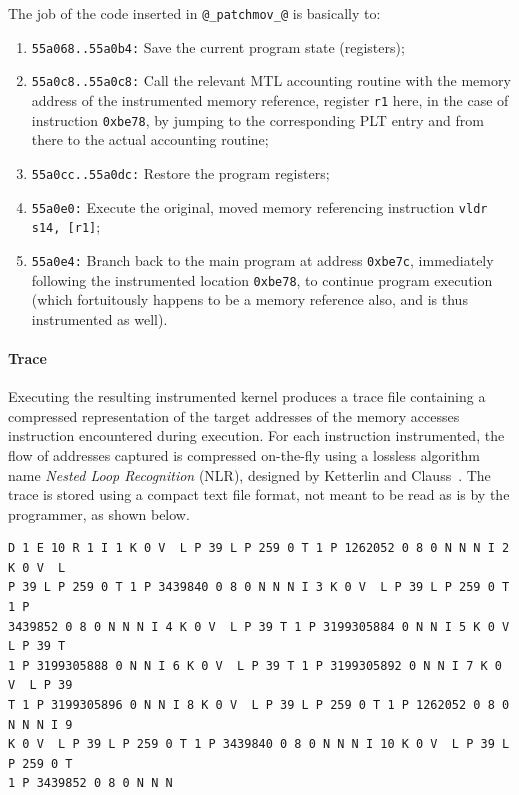 \documentclass[11pt, a4paper, twoside]{montblanc2}
\begin{document}
The job of the code inserted in \verb|@_patchmov_@| is basically to:
\begin{enumerate}
\item \texttt{55a068..55a0b4:} Save the current program state (registers);
\item \texttt{55a0c8..55a0c8:} Call the relevant MTL accounting routine with the 
memory address of the instrumented memory reference, register \texttt{r1} here, 
in the case of instruction \texttt{0xbe78}, by jumping to the corresponding PLT 
entry and from there to the actual accounting routine;
\item \texttt{55a0cc..55a0dc:} Restore the program registers;
\item \texttt{55a0e0:} Execute the original, moved memory referencing 
instruction \verb|vldr s14, [r1]|;
\item \texttt{55a0e4:} Branch back to the main program at address 
  \texttt{0xbe7c}, immediately following the instrumented location 
  \texttt{0xbe78}, to continue program execution (which fortuitously happens to 
  be a memory reference also, and is thus instrumented as well).
\end{enumerate}

\paragraph{Trace}

Executing the resulting instrumented kernel produces a trace file containing a 
compressed representation of the target addresses of the memory accesses 
instruction encountered during execution. For each instruction instrumented, the 
flow of addresses captured is compressed on-the-fly using a lossless
algorithm name \emph{Nested Loop Recognition} (NLR), designed by Ketterlin and 
Clauss~\cite{ketterlin:nlr:cgo:2008}. The trace is stored using a compact text 
file format, not meant to be read as is by the programmer, as shown below.

\begin{footnotesize}
\begin{verbatim}
D 1 E 10 R 1 I 1 K 0 V  L P 39 L P 259 0 T 1 P 1262052 0 8 0 N N N I 2 K 0 V  L 
P 39 L P 259 0 T 1 P 3439840 0 8 0 N N N I 3 K 0 V  L P 39 L P 259 0 T 1 P 
3439852 0 8 0 N N N I 4 K 0 V  L P 39 T 1 P 3199305884 0 N N I 5 K 0 V  L P 39 T 
1 P 3199305888 0 N N I 6 K 0 V  L P 39 T 1 P 3199305892 0 N N I 7 K 0 V  L P 39 
T 1 P 3199305896 0 N N I 8 K 0 V  L P 39 L P 259 0 T 1 P 1262052 0 8 0 N N N I 9 
K 0 V  L P 39 L P 259 0 T 1 P 3439840 0 8 0 N N N I 10 K 0 V  L P 39 L P 259 0 T 
1 P 3439852 0 8 0 N N N 
\end{verbatim}
\end{footnotesize}
\end{document}
